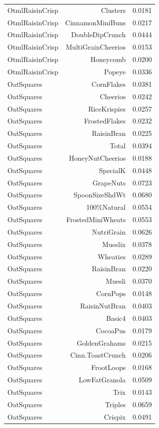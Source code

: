 \begin{longtable}{@{}lrr@{}}
OtmlRaisinCrisp & Clusters & 0.0181 \\
OtmlRaisinCrisp & CinnamonMiniBuns & 0.0217 \\
OtmlRaisinCrisp & DoubleDipCrunch & 0.0444 \\
OtmlRaisinCrisp & MultiGrainCheerios & 0.0153 \\
OtmlRaisinCrisp & Honeycomb & 0.0200 \\
OtmlRaisinCrisp & Popeye & 0.0336 \\
OatSquares & CornFlakes & 0.0381 \\
OatSquares & Cheerios & 0.0242 \\
OatSquares & RiceKrispies & 0.0257 \\
OatSquares & FrostedFlakes & 0.0232 \\
OatSquares & RaisinBran & 0.0225 \\
OatSquares & Total & 0.0394 \\
OatSquares & HoneyNutCheerios & 0.0188 \\
OatSquares & SpecialK & 0.0448 \\
OatSquares & GrapeNuts & 0.0723 \\
OatSquares & SpoonSizeShdWt & 0.0680 \\
OatSquares & 100\%Natural & 0.0554 \\
OatSquares & FrostedMiniWheats & 0.0553 \\
OatSquares & NutriGrain & 0.0626 \\
OatSquares & Mueslix & 0.0378 \\
OatSquares & Wheaties & 0.0289 \\
OatSquares & RaisinBran & 0.0220 \\
OatSquares & Muesli & 0.0370 \\
OatSquares & CornPops & 0.0148 \\
OatSquares & RaisinNutBran & 0.0403 \\
OatSquares & Basic4 & 0.0403 \\
OatSquares & CocoaPus & 0.0179 \\
OatSquares & GoldenGrahams & 0.0215 \\
OatSquares & Cinn.ToastCrunch & 0.0206 \\
OatSquares & FrootLoops & 0.0168 \\
OatSquares & LowFatGranola & 0.0509 \\
OatSquares & Trix & 0.0143 \\
OatSquares & Triples & 0.0659 \\
OatSquares & Crispix & 0.0491 \\

\end{longtable}
